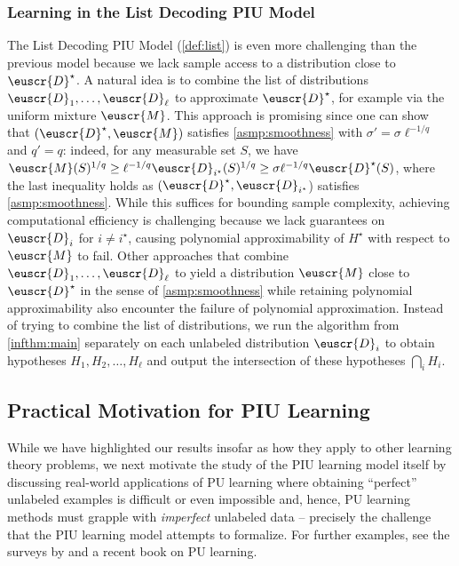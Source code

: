 \documentclass[11pt]{article}
\theoremstyle{plain}
\theoremstyle{definition}
\theoremstyle{remark}
\newcommand{\customcal}[1]{\euscr{#1}}
\newcommand{\cD}{\customcal{D}}
\newcommand{\cM}{\customcal{M}}
\newcommand{\optset}{{H^\star}}
\newcommand{\cDtrue}{\cD^\star}
\begin{document}
        \subsubsection{Learning in the List Decoding PIU Model}
            The List Decoding PIU Model (\cref{def:list}) is even more challenging than the previous model because we lack sample access to a distribution close to $\cDtrue$. A natural idea is to combine the list of distributions $\cD_1,\dots,\cD_\ell$ to approximate $\cDtrue$, for example via the uniform mixture $\cM$. This approach is promising since one can show that $(\cDtrue,\cM)$ satisfies \cref{asmp:smoothness} with $\sigma'=\sigma \ell^{-1/q}$ and $q'=q$: indeed, for any measurable set $S$, we have $\cM(S)^{1/q}\geq \ell^{-1/q}\cD_{i^\star}(S)^{1/q}\geq \sigma\ell^{-1/q}\cDtrue(S)$, where the last inequality holds as $(\cDtrue,\cD_{i^\star}$) satisfies \cref{asmp:smoothness}. While this suffices for bounding sample complexity, achieving computational efficiency is challenging because we lack guarantees on $\cD_i$ for $i\neq i^\star$, causing polynomial approximability of $\optset$ with respect to $\cM$ to fail. Other approaches that combine $\cD_1,\dots,\cD_\ell$ to yield a distribution $\cM$ close to $\cDtrue$ in the sense of \cref{asmp:smoothness} while retaining polynomial approximability also encounter the failure of polynomial approximation. 
            Instead of trying to combine the list of distributions, we run the algorithm from \cref{infthm:main} separately on each unlabeled distribution $\cD_i$ to obtain hypotheses $H_1,H_2,\dots,H_\ell$ and output the intersection of these hypotheses $\bigcap_i H_i$.
            
            
            
            
             
            
            
 
    \subsection{Practical Motivation for PIU Learning}
    \label{sec:realWorldApplications}
    \label{sec:intro:realWorldApplications} 
    \noindent While we have highlighted our results insofar as how they apply to other learning theory problems, %
    we next motivate the study of the PIU learning model itself by discussing real-world applications of PU learning where obtaining ``perfect'' unlabeled examples is difficult or even impossible and, hence, PU learning methods must grapple with \textit{imperfect} unlabeled data -- precisely the challenge that the PIU learning model attempts to formalize. %
    For further examples, see the surveys by \citet{elkan2008pu,plessis15convex} and a recent book \cite{jaskie2022positive} on PU learning. %
    
\end{document}
